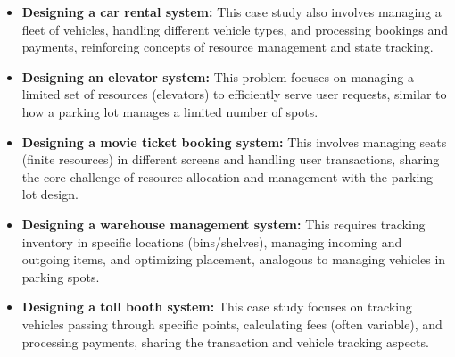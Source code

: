 \begin{itemize}
\item
\protect{}\label{HymjFV-WdhO9S87CBGInV}
\textbf{Designing a car rental system:} This case study also involves managing a fleet of vehicles, handling different vehicle types, and processing bookings and payments, reinforcing concepts of resource management and state tracking.
\item
\protect{}\label{Xu99cWLeTemrLuzb5xGux}
\textbf{Designing an elevator system:} This problem focuses on managing a limited set of resources (elevators) to efficiently serve user requests, similar to how a parking lot manages a limited number of spots.
\item
\protect{}\label{Eakqen9z8IwAIaQ9XNY3A}
\textbf{Designing a movie ticket booking system:} This involves managing seats (finite resources) in different screens and handling user transactions, sharing the core challenge of resource allocation and management with the parking lot design.
\item
\protect{}\label{taviRPRx7q2oRbpE8PHls}
\textbf{Designing a warehouse management system:} This requires tracking inventory in specific locations (bins/shelves), managing incoming and outgoing items, and optimizing placement, analogous to managing vehicles in parking spots.
\item
\protect{}\label{ng38ZBv59rAeXzxKaXWAH}
\textbf{Designing a toll booth system:} This case study focuses on tracking vehicles passing through specific points, calculating fees (often variable), and processing payments, sharing the transaction and vehicle tracking aspects.
\end{itemize}

